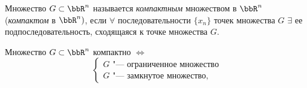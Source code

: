 \begin{defn}
Множество $G \subset \bbR^n$ называется \textit{компактным} множеством в $\bbR^n$ (\textit{компактом} в $\bbR^n)$, если $\forall$ последовательности $\{ x_n \}$ точек множества $G$ $\exists$ ее подпоследовательность, сходящаяся к точке множества $G$.
\end{defn}

\begin{thm}
Множество $G \subset \bbR^n$ компактно $\Leftrightarrow$
\begin{equation}
\begin{cases}
G \textit{ "--- ограниченное множество} \\
G \textit{ "--- замкнутое множество},
\end{cases}
\end{equation}
\end{thm}

